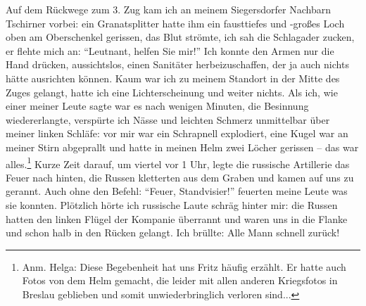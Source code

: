 





Auf dem Rückwege zum 3. Zug kam ich an meinem Siegersdorfer Nachbarn Tschirner vorbei: ein Granatsplitter hatte ihm ein fausttiefes und -großes Loch oben am Oberschenkel gerissen, das Blut strömte, ich sah die Schlagader zucken, er flehte mich an: \enquote{Leutnant, helfen Sie mir!} Ich konnte den Armen nur die Hand drücken, aussichtslos, einen Sanitäter herbeizuschaffen, der ja auch nichts hätte ausrichten können. Kaum war ich zu meinem Standort in der Mitte des Zuges gelangt, hatte ich eine Lichterscheinung und weiter nichts. Als ich, wie einer meiner Leute sagte war es nach wenigen Minuten, die Besinnung wiedererlangte, verspürte ich Nässe und leichten Schmerz unmittelbar über meiner linken Schläfe: vor mir war ein Schrapnell explodiert, eine Kugel war an meiner Stirn abgeprallt und hatte in meinen Helm zwei Löcher gerissen -- das war alles.\footnote{Anm. Helga: Diese Begebenheit hat uns Fritz häufig erzählt. Er hatte auch Fotos von dem Helm gemacht, die leider mit allen anderen Kriegsfotos in Breslau geblieben und somit unwiederbringlich verloren sind...}  Kurze Zeit darauf, um viertel vor 1 Uhr, legte die russische Artillerie das Feuer nach hinten, die Russen kletterten aus dem Graben und kamen auf uns zu gerannt. Auch ohne den Befehl: \enquote{Feuer, Standvisier!} feuerten meine Leute was sie konnten. Plötzlich hörte ich russische Laute schräg hinter mir: die Russen hatten den linken Flügel der Kompanie überrannt und waren uns in die Flanke und schon halb in den Rücken gelangt. Ich brüllte: Alle Mann schnell zurück!

